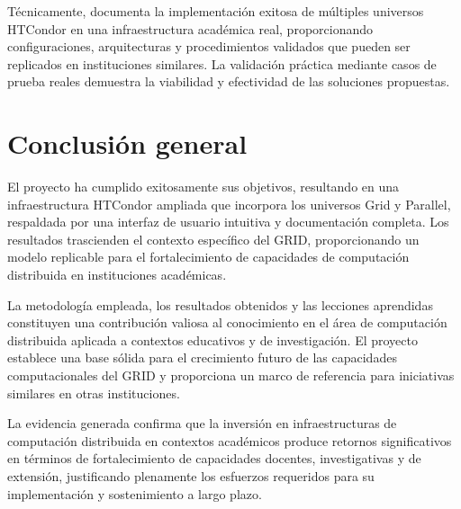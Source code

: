 Técnicamente, documenta la implementación exitosa de múltiples universos HTCondor en una infraestructura académica real, proporcionando configuraciones, arquitecturas y procedimientos validados que pueden ser replicados en instituciones similares. La validación práctica mediante casos de prueba reales demuestra la viabilidad y efectividad de las soluciones propuestas.

\section{Conclusión general}
\noindent

El proyecto ha cumplido exitosamente sus objetivos, resultando en una infraestructura HTCondor ampliada que incorpora los universos Grid y Parallel, respaldada por una interfaz de usuario intuitiva y documentación completa. Los resultados trascienden el contexto específico del GRID, proporcionando un modelo replicable para el fortalecimiento de capacidades de computación distribuida en instituciones académicas.

La metodología empleada, los resultados obtenidos y las lecciones aprendidas constituyen una contribución valiosa al conocimiento en el área de computación distribuida aplicada a contextos educativos y de investigación. El proyecto establece una base sólida para el crecimiento futuro de las capacidades computacionales del GRID y proporciona un marco de referencia para iniciativas similares en otras instituciones.

La evidencia generada confirma que la inversión en infraestructuras de computación distribuida en contextos académicos produce retornos significativos en términos de fortalecimiento de capacidades docentes, investigativas y de extensión, justificando plenamente los esfuerzos requeridos para su implementación y sostenimiento a largo plazo.
